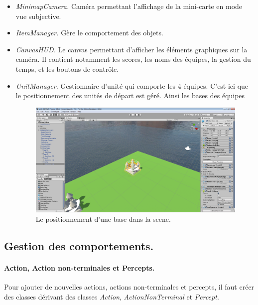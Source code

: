 \documentclass{report}
\begin{document}
\begin{itemize}
\item \textit{MinimapCamera.} Caméra permettant l'affichage de la mini-carte en mode vue subjective.
\item \textit{ItemManager.} Gère le comportement des objets.
\item \textit{CanvasHUD.} Le canvas permettant d'afficher les éléments graphiques sur la caméra. Il contient notamment les scores, les noms des équipes, la gestion du temps, et les boutons de contrôle.
\item \textit{UnitManager.} Gestionnaire d'unité qui comporte les 4 équipes. C'est ici que le positionnement des unités de départ est géré. Ainsi les bases des équipes 

\begin{figure}[!h]
\centering
\includegraphics[scale=0.35]{UnitManagerImage}
\caption{Le positionnement d'une base dans la scene.}
\end{figure}

\end{itemize}

\subsection{Gestion des comportements.}
\paragraph{Action, Action non-terminales et Percepts.}
Pour ajouter de nouvelles actions, actions non-terminales et percepts, il faut créer des classes dérivant des classes \textit{Action}, \textit{ActionNonTerminal} et \textit{Percept}.
\end{document}
